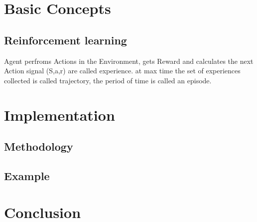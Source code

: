 \documentclass[conference]{IEEEtran}
\begin{document}
\section{Basic Concepts}
\subsection{Reinforcement learning}
Agent perfroms Actions in the Environment, gets Reward and calculates the next Action
signal (S,a,r) are called experience. 
at max time the set of experiences collected is called trajectory, the period of time is called an episode.

\section{Implementation}

\subsection{Methodology}

\subsection{Example}

\section{Conclusion}
 

\end{document}
